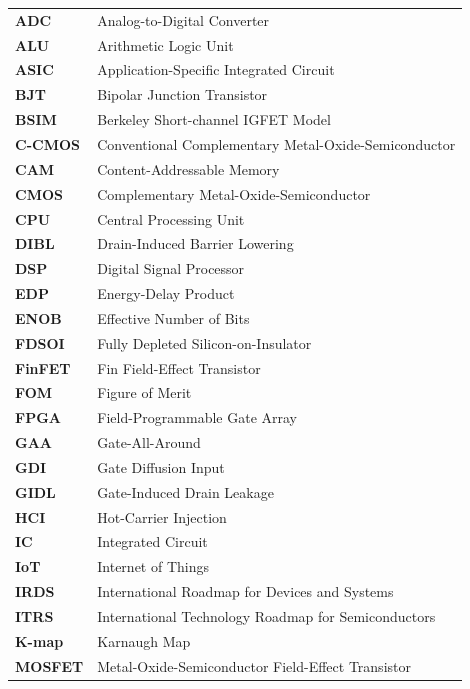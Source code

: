 \documentclass[12pt,a4paper,oneside]{report}
\begin{document}
\noindent\begin{tabular}{p{3cm} p{10.5cm}}
\textbf{ADC} & Analog-to-Digital Converter \\[5pt]
\textbf{ALU} & Arithmetic Logic Unit \\[5pt]
\textbf{ASIC} & Application-Specific Integrated Circuit \\[5pt]
\textbf{BJT} & Bipolar Junction Transistor \\[5pt]
\textbf{BSIM} & Berkeley Short-channel IGFET Model \\[5pt]
\textbf{C-CMOS} & Conventional Complementary Metal-Oxide-Semiconductor \\[5pt]
\textbf{CAM} & Content-Addressable Memory \\[5pt]
\textbf{CMOS} & Complementary Metal-Oxide-Semiconductor \\[5pt]
\textbf{CPU} & Central Processing Unit \\[5pt]
\textbf{DIBL} & Drain-Induced Barrier Lowering \\[5pt]
\textbf{DSP} & Digital Signal Processor \\[5pt]
\textbf{EDP} & Energy-Delay Product \\[5pt]
\textbf{ENOB} & Effective Number of Bits \\[5pt]
\textbf{FDSOI} & Fully Depleted Silicon-on-Insulator \\[5pt]
\textbf{FinFET} & Fin Field-Effect Transistor \\[5pt]
\textbf{FOM} & Figure of Merit \\[5pt]
\textbf{FPGA} & Field-Programmable Gate Array \\[5pt]
\textbf{GAA} & Gate-All-Around \\[5pt]
\textbf{GDI} & Gate Diffusion Input \\[5pt]
\textbf{GIDL} & Gate-Induced Drain Leakage \\[5pt]
\textbf{HCI} & Hot-Carrier Injection \\[5pt]
\textbf{IC} & Integrated Circuit \\[5pt]
\textbf{IoT} & Internet of Things \\[5pt]
\textbf{IRDS} & International Roadmap for Devices and Systems \\[5pt]
\textbf{ITRS} & International Technology Roadmap for Semiconductors \\[5pt]
\textbf{K-map} & Karnaugh Map \\[5pt]
\textbf{MOSFET} & Metal-Oxide-Semiconductor Field-Effect Transistor \\[5pt]

\end{tabular}
\end{document}
